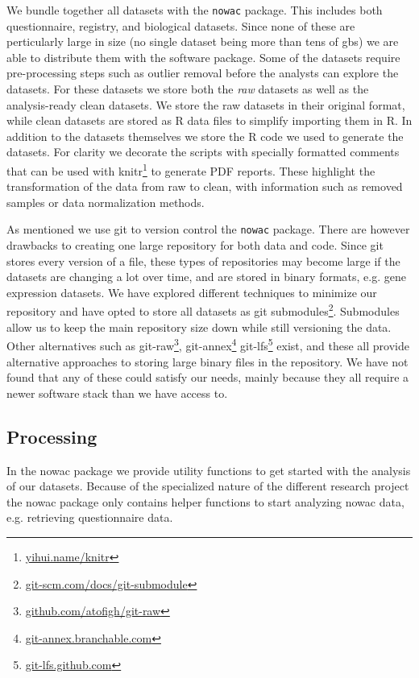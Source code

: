 We bundle together all datasets with the \texttt{nowac} package. This includes
both questionnaire, registry, and biological datasets. Since none of these are
perticularly large in size (no single dataset being more than tens of
\glspl{gb}) we are able to distribute them with the software package. Some of
the datasets require pre-processing steps such as outlier removal before the
analysts can explore the datasets. For these datasets we store both the
\emph{raw} datasets as well as the analysis-ready clean datasets. We store the
raw datasets in their original format, while clean datasets are stored as R data
files to simplify importing them in R. In addition to the datasets themselves we
store the R code we used to generate the datasets. For clarity we decorate the
scripts with specially formatted comments that can be used with
knitr\footnote{\url{yihui.name/knitr}} to generate PDF reports. These highlight
the transformation of the data from raw to clean, with information such as
removed samples or data normalization methods. 

As mentioned we use git to version control the \texttt{nowac} package. There are
however drawbacks to creating one large repository for both data and code. Since
git stores every version of a file, these types of repositories may become large
if the datasets are changing a lot over time, and are stored in binary formats,
e.g. gene expression datasets. We have explored different techniques to minimize
our repository and have opted to store all datasets as git
submodules\footnote{\url{git-scm.com/docs/git-submodule}}. Submodules allow us
to keep the main repository size down while still versioning the data. Other
alternatives such as git-raw\footnote{\url{github.com/atofigh/git-raw}},
git-annex\footnote{\url{git-annex.branchable.com}} 
git-lfs\footnote{\url{git-lfs.github.com}} exist, and these all provide
alternative approaches to storing large binary files in the repository. We have
not found that any of these could satisfy our needs, mainly because they all
require a newer software stack than we have access to.

\subsection{Processing} 
In the \gls{nowac} package we provide utility functions to get started with the
analysis of our datasets. Because of the specialized nature of the different
research project the \gls{nowac} package only contains helper functions to start
analyzing \gls{nowac} data, e.g. retrieving questionnaire data. 


